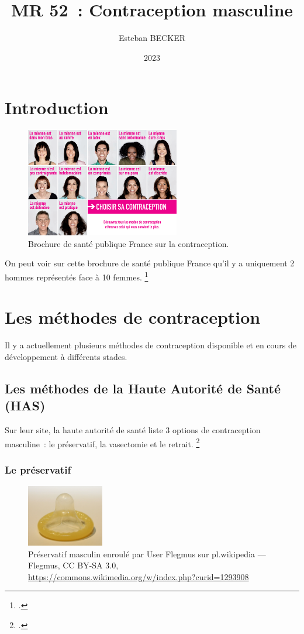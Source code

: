 \documentclass[12pt,a4paper]{report}
\title{MR 52 : Contraception masculine}
\author{Esteban BECKER}
\date{2023}
\begin{document}
\maketitle
\tableofcontents
\chapter*{Introduction}

\begin{figure}[!htb]
    \centering
    \includegraphics[width=0.6\textwidth]{images/intro/choisir-sa-contraception.png}
    \caption{Brochure de santé publique France sur la contraception.}
    \label{fig:brochureSPF}
\end{figure}
On peut voir sur cette brochure de santé publique France qu'il y a uniquement 2 hommes représentés face à 10 femmes. \footcite{santepublicfranceChoisirSaContraception2019}
\chapter{Les méthodes de contraception}

Il y a actuellement plusieurs méthodes de contraception disponible et en cours de développement à différents stades.

\section{Les méthodes de la Haute Autorité de Santé (HAS)}
Sur leur site, la haute autorité de santé liste 3 options de contraception masculine : le préservatif, la vasectomie et le retrait. \footcite{ContraceptionChezHomme2019}

\subsection{Le préservatif}

\begin{figure}[!htb]
    \centering
    \includegraphics[width=0.3\textwidth]{images/scientiphique/Kondom.jpg}
    \caption{Préservatif masculin enroulé par User Flegmus sur pl.wikipedia — Flegmus, CC BY-SA 3.0, \href{https://commons.wikimedia.org/w/index.php?curid=1293908}{https://commons.wikimedia.org/w/index.php?curid=1293908}}
    \label{fig:preservatif}
\end{figure}
\end{document}

